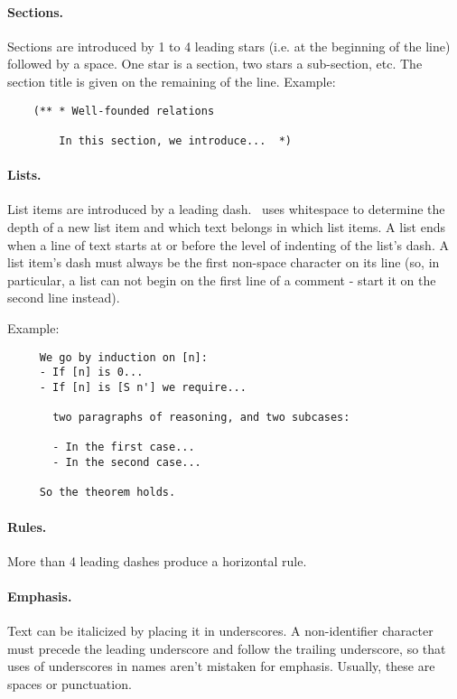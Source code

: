 \paragraph{Sections.}
Sections are introduced by 1 to 4 leading stars (i.e. at the beginning of the
line) followed by a space. One star is a section, two stars a sub-section, etc.
The section title is given on the remaining of the line.
Example:
\begin{verbatim}
    (** * Well-founded relations
  
        In this section, we introduce...  *)
\end{verbatim}




\paragraph{Lists.}
List items are introduced by a leading dash.  \coqdoc\ uses whitespace
to determine the depth of a new list item and which text belongs in
which list items.  A list ends when a line of text starts at or before
the level of indenting of the list's dash.  A list item's dash must
always be the first non-space character on its line (so, in
particular, a list can not begin on the first line of a comment -
start it on the second line instead).

Example:
\begin{verbatim}
     We go by induction on [n]:
     - If [n] is 0...
     - If [n] is [S n'] we require...

       two paragraphs of reasoning, and two subcases:

       - In the first case...
       - In the second case...

     So the theorem holds.
\end{verbatim}

\paragraph{Rules.}
More than 4 leading dashes produce a horizontal rule.

\paragraph{Emphasis.}
Text can be italicized by placing it in underscores.  A non-identifier
character must precede the leading underscore and follow the trailing
underscore, so that uses of underscores in names aren't mistaken for
emphasis.  Usually, these are spaces or punctuation.

